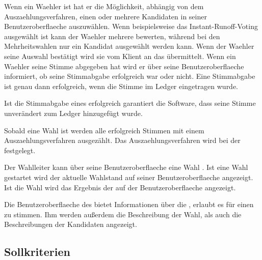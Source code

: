 \documentclass[parskip=full,11pt,twoside]{scrartcl}
\begin{document}
Wenn ein \gls{Waehler}  ist hat er die Möglichkeit, abhängig von dem \gls{Auszaehlungsverfahren}, einen oder mehrere Kandidaten in seiner \gls{Benutzeroberflaeche} auszuwählen. Wenn beispielsweise das \gls{Instant-Runoff-Voting} ausgewählt ist kann der \gls{Waehler} mehrere  bewerten, während bei den Mehrheitswahlen nur ein \gls{Kandidat} ausgewählt werden kann.
Wenn der \gls{Waehler} seine Auswahl bestätigt wird sie vom \gls{Klient} an das  übermittelt.
Wenn ein \gls{Waehler} seine \gls{Stimme} abgegeben hat wird er über seine \gls{Benutzeroberflaeche} informiert, ob seine \gls{Stimmabgabe} erfolgreich war oder nicht. Eine \gls{Stimmabgabe} ist genau dann erfolgreich, wenn die \gls{Stimme} im \gls{Ledger} eingetragen wurde.

Ist die \gls{Stimmabgabe} eines  erfolgreich garantiert die Software, dass seine \gls{Stimme} unverändert zum \gls{Ledger} hinzugefügt wurde.

Sobald eine \gls{Wahl}  ist werden alle erfolgreich  Stimmen mit einem \gls{Auszaehlungsverfahren} ausgezählt. Das \gls{Auszaehlungsverfahren} wird bei der  festgelegt.

Der \gls{Wahlleiter} kann über seine \gls{Benutzeroberflaeche} eine Wahl . Ist eine \gls{Wahl} gestartet wird der aktuelle \gls{Wahlstand} auf seiner \gls{Benutzeroberflaeche} angezeigt. Ist die Wahl  wird das Ergebnis der  auf der \gls{Benutzeroberflaeche} angezeigt.

Die \gls{Benutzeroberflaeche} des  bietet Informationen über die , erlaubt es für einen  zu stimmen. Ihm werden außerdem die Beschreibung der Wahl, als auch die Beschreibungen der Kandidaten angezeigt.

\subsection{Sollkriterien}
\end{document}
